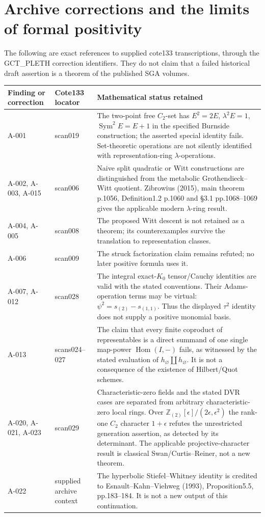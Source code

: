 \section{Archive corrections and the limits of formal positivity}

The following are exact references to supplied cote133
transcriptions, through the GCT\_PLETH correction identifiers.
They do not claim that a failed historical draft assertion
is a theorem of the published SGA volumes.

\begin{longtable}{p{}p{}p{}}
\toprule
Finding or correction & Cote133 locator & Mathematical status retained\\
\midrule\endhead
A-001 & scan019 & The two-point free $C_2$-set has $E^2=2E$,
$\lambda^2E=1$, $\operatorname{Sym}^2E=E+1$ in the specified
Burnside construction; the asserted special identity fails.
Set-theoretic operations are not silently identified with
representation-ring $\lambda$-operations.\\
A-002, A-003, A-015 & scan006 & Naive split quadratic or Witt
constructions are distinguished from the metabolic
Grothendieck--Witt quotient.  Zibrowius (2015), main theorem
p.1056, Definition1.2 p.1060 and \S3.1 pp.1068--1069 gives
the applicable modern $\lambda$-ring result.\\
A-004, A-005 & scan008 & The proposed Witt descent is not
retained as a theorem; its counterexamples survive the
translation to representation classes.\\
A-006 & scan009 & The struck factorization claim remains
refuted; no later positive formula uses it.\\
A-007, A-012 & scan028 & The integral exact-$K_0$ tensor/Cauchy
identities are valid with the stated conventions.  Their
Adams-operation terms may be virtual:
$\psi^2=s_{(2)}-s_{(1,1)}$.  Thus the displayed $\tau^2$
identity does not supply a positive monomial basis.\\
A-013 & scans024--027 & The claim that every finite coproduct
of representables is a direct summand of one single map-power
$\operatorname{Hom}(I,-)$ fails, as witnessed by
the stated evaluation of $h_\varnothing\amalg h_\varnothing$.
It is not a consequence of the existence of Hilbert/Quot
schemes.\\
A-020, A-021, A-023 & scan029 & Characteristic-zero fields and
the stated DVR cases are separated from arbitrary
characteristic-zero local rings.  Over
$\mathbb Z_{(2)}[\epsilon]/(2\epsilon,\epsilon^2)$ the
rank-one $C_2$ character $1+\epsilon$ refutes the unrestricted
generation assertion, as detected by its determinant.
The applicable projective-character
result is classical Swan/Curtis--Reiner, not a new theorem.\\
A-022 & supplied archive context & The hyperbolic
Stiefel--Whitney identity is credited to Esnault--Kahn--Viehweg
(1993), Proposition5.5, pp.183--184.  It is not a new output
of this continuation.\\
\bottomrule
\end{longtable}

